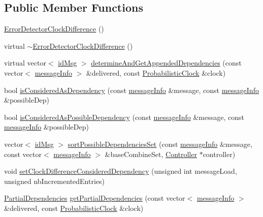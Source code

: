 \subsection*{Public Member Functions}
\begin{DoxyCompactItemize}
\item 
\hyperlink{classErrorDetectorClockDifference_a5edb355be9179cd604d3e7f946846c55}{Error\+Detector\+Clock\+Difference} ()
\item 
virtual \hyperlink{classErrorDetectorClockDifference_a19bda307bcb9a8974a97fdf56fb77b8f}{$\sim$\+Error\+Detector\+Clock\+Difference} ()
\item 
virtual vector$<$ \hyperlink{structures_8h_a83a1d9a070efa5341da84cfd8e28d3e5}{id\+Msg} $>$ \hyperlink{classErrorDetectorClockDifference_a15406c8d7652f3b9358b1958d3723933}{determine\+And\+Get\+Appended\+Dependencies} (const vector$<$ \hyperlink{structures_8h_a7e7bdc1d2fff8a9436f2f352b2711ed6}{message\+Info} $>$ \&delivered, const \hyperlink{classProbabilisticClock}{Probabilistic\+Clock} \&clock)
\item 
bool \hyperlink{classErrorDetectorClockDifference_a4d399849b1872d3273fa757ee9dc9bd9}{is\+Considered\+As\+Dependency} (const \hyperlink{structures_8h_a7e7bdc1d2fff8a9436f2f352b2711ed6}{message\+Info} \&message, const \hyperlink{structures_8h_a7e7bdc1d2fff8a9436f2f352b2711ed6}{message\+Info} \&possible\+Dep)
\item 
bool \hyperlink{classErrorDetectorClockDifference_ab20aa1671eb558dea6f06b2440e97e41}{is\+Considered\+As\+Possible\+Dependency} (const \hyperlink{structures_8h_a7e7bdc1d2fff8a9436f2f352b2711ed6}{message\+Info} \&message, const \hyperlink{structures_8h_a7e7bdc1d2fff8a9436f2f352b2711ed6}{message\+Info} \&possible\+Dep)
\item 
vector$<$ \hyperlink{structures_8h_a83a1d9a070efa5341da84cfd8e28d3e5}{id\+Msg} $>$ \hyperlink{classErrorDetectorClockDifference_a740f6bd74b30e0b194c4b64d79bb8caf}{sort\+Possible\+Dependencies\+Set} (const \hyperlink{structures_8h_a7e7bdc1d2fff8a9436f2f352b2711ed6}{message\+Info} \&message, const vector$<$ \hyperlink{structures_8h_a7e7bdc1d2fff8a9436f2f352b2711ed6}{message\+Info} $>$ \&base\+Combine\+Set, \hyperlink{classController}{Controller} $\ast$controller)
\item 
void \hyperlink{classErrorDetectorClockDifference_a529b87b6eaee9041601af1ca36b51c93}{set\+Clock\+Difference\+Considered\+Dependency} (unsigned int message\+Load, unsigned nb\+Incremented\+Entries)
\item 
\hyperlink{classPartialDependencies}{Partial\+Dependencies} \hyperlink{classErrorDetectorClockDifference_a26f4c2905859947201d0a18146f2e961}{get\+Partial\+Dependencies} (const vector$<$ \hyperlink{structures_8h_a7e7bdc1d2fff8a9436f2f352b2711ed6}{message\+Info} $>$ \&delivered, const \hyperlink{classProbabilisticClock}{Probabilistic\+Clock} \&clock)
\end{DoxyCompactItemize}
